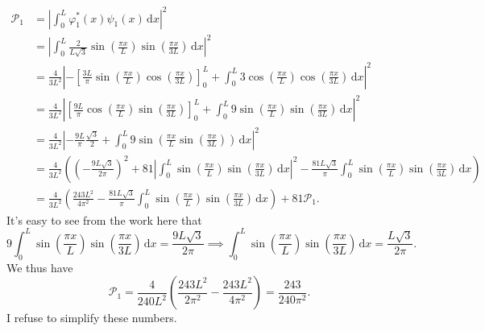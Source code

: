 \documentclass[11pt, letterpaper]{article}
\begin{document}
\begin{enumerate}
		\begin{align*}
			\mathcal{P}_1 &=\left|\int_{0}^{L} \varphi_1^*(x)\psi_1(x) \,\mathrm{d} x\right|^2\\
				      &=\left| \int_{0}^{L} \frac{2}{L\sqrt{3} } \sin \left( \frac{\pi x}{L}  \right) \sin \left( \frac{\pi x}{3L}  \right)  \,\mathrm{d} x \right| ^2\\
				      &=\frac{4}{3L^2} \left| -\left[ \frac{3L}{\pi } \sin \left( \frac{\pi x}{L} \right) \cos \left( \frac{\pi x}{3L}   \right)  \right]_0^L+\int_{0}^{L} 3\cos \left( \frac{\pi x}{L}  \right) \cos \left( \frac{\pi x}{3L}  \right)  \,\mathrm{d} x \right| ^2\\
				      &=\frac{4}{3L^2} \left| \left[ \frac{9L}{\pi } \cos \left( \frac{\pi x}{L}  \right) \sin \left( \frac{\pi x}{3L}  \right)  \right]_0^L+\int_{0}^{L} 9 \sin \left( \frac{\pi x}{L}  \right) \sin \left( \frac{\pi x}{3L}  \right)  \,\mathrm{d} x \right| ^2\\
				      &=\frac{4}{3L^2} \left| -\frac{9L}{\pi }\frac{\sqrt{3} }{2}+\int_{0}^{L} 9 \sin \left( \frac{\pi x}{L} \sin \left( \frac{\pi x}{3L}  \right)  \right)  \,\mathrm{d} x \right| ^2\\
				      &=\frac{4}{3L^2} \left(\left( -\frac{9L\sqrt{3} }{2\pi }  \right)^2+81\left| \int_{0}^{L} \sin \left( \frac{\pi x}{L}  \right) \sin \left( \frac{\pi x}{3L}  \right)  \,\mathrm{d} x \right| ^2-\frac{81L\sqrt{3} }{\pi } \int_{0}^{L} \sin \left( \frac{\pi x}{L}  \right) \sin \left( \frac{\pi x}{3L}  \right)  \,\mathrm{d} x\right)\\
				      &=\frac{4}{3L^2} \left( \frac{243L^2}{4\pi ^2} -\frac{81L\sqrt{3} }{\pi } \int_{0}^{L} \sin \left( \frac{\pi x}{L}  \right) \sin \left( \frac{\pi x}{3L}  \right)  \,\mathrm{d} x \right) +81\mathcal{P}_1
		.\end{align*}
		It's easy to see from the work here that
		\[
			9\int_{0}^{L} \sin \left( \frac{\pi x}{L}  \right) \sin \left( \frac{\pi x}{3L}  \right)  \,\mathrm{d} x=\frac{9L\sqrt{3} }{2\pi } \implies \int_{0}^{L} \sin \left( \frac{\pi x}{L}  \right) \sin \left( \frac{\pi x}{3L}  \right)  \,\mathrm{d} x=\frac{L\sqrt{3} }{2\pi } 
		.\]
		We thus have
		\[
			\mathcal{P}_1 = \frac{4}{240L^2} \left( \frac{243L^2}{2\pi ^2} -\frac{243L^2}{4\pi ^2}  \right) =\frac{243}{240\pi ^2} 
		.\]
		I refuse to simplify these numbers.


\end{enumerate}
\end{document}
